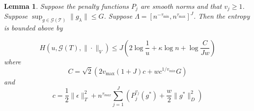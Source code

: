 \documentclass[12pt]{article}
\newtheorem{lemma}{Lemma}
\begin{document}
\begin{lemma}
\label{smooth_entropy_lemma}
Suppose the penalty functions $P_j$ are smooth norms and that $v_j \ge 1$. Suppose $\sup_{g \in \mathcal{G(T)}} \|g_\lambda\| \le G$. 
Suppose $\Lambda = [n^{- \tau_{\min}} , n^{\tau_{\max}}]^J$.
Then the entropy is bounded above by

\begin{equation}
\label{smooth_entropy_bound}
H(u, \mathcal{G}(T), \| \cdot \|_V) \le J \left ( 2 \log \frac{1}{u} + \kappa \log n + \log \frac{C}{Jw}\right )
\end{equation}
where 
\[
C = \sqrt{2}\left(2v_{\max}(1+J)c+wc^{1/v_{min}}G\right)
\] 
and
\[
c = \frac{1}{2}\|\epsilon\|_{T}^{2}+n^{\tau_{max}}\sum_{j=1}^{J}\left(P_{j}^{v_{j}}(g^{*})+\frac{w}{2}\|g^{*}\|_{D}^{2}\right)
\]

\end{lemma}
\end{document}
